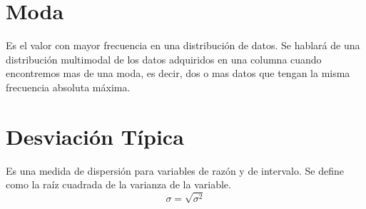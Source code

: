 \section{Moda}
Es el valor con mayor frecuencia en una distribución de datos.
Se hablará de una distribución multimodal de los datos adquiridos en una columna cuando encontremos mas de una moda, es decir, dos o mas datos que tengan la misma frecuencia absoluta máxima.
\section{Desviación Típica}
Es una medida de dispersión para variables de razón y de intervalo. Se define como la raíz cuadrada de la varianza de la variable.
\begin{equation}
    \sigma = \sqrt{\sigma^2}
\end{equation}
